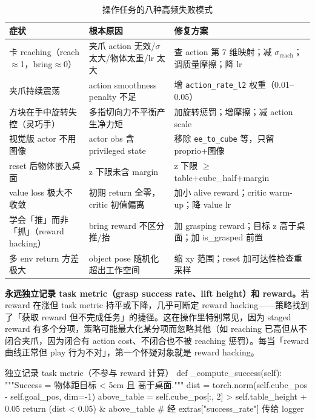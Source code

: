 \begin{table}[ht]
\centering
\small
\caption{操作任务的八种高频失败模式}
\label{tab:rlmc-manip-fail}
\begin{tabular}{@{}p{3.0cm}p{4.2cm}p{4.6cm}@{}}
\toprule
症状 & 根本原因 & 修复方案 \\
\midrule
卡 reaching（reach$\approx$1，bring$\approx$0） & 夹爪 action 无效/$\sigma$ 太大/物体太重/lr 太大 & 查 action 第 7 维映射；减 $\sigma_{\text{reach}}$；调质量摩擦；降 lr \\
夹爪持续震荡 & action smoothness penalty 不足 & 增 \verb|action_rate_l2| 权重（0.01--0.05） \\
方块在手中旋转失控（灵巧手） & 多指切向力不平衡产生净力矩 & 加旋转惩罚；增摩擦；减 action scale \\
视觉版 actor 不用图像 & actor obs 含 privileged state & 移除 \verb|ee_to_cube| 等，只留 proprio+图像 \\
reset 后物体嵌入桌面 & z 下限未含 margin & z 下限 $\ge$ table+cube\_half+margin \\
value loss 极大不收敛 & 初期 return 全零，critic 初值偏离 & 加小 alive reward；critic warm-up；降 value lr \\
学会「推」而非「抓」（reward hacking） & bring reward 不区分推/抬 & 加 grasping reward；目标 z 高于桌面；加 is\_grasped 前置 \\
多 env return 方差极大 & object pose 随机化超出工作空间 & 缩 xy 范围；reset 加可达性检查重采样 \\
\bottomrule
\end{tabular}
\end{table}

\begin{insight}[黄金诊断原则：Reward Up, Task Metric Flat = Reward Hacking]\label{ins:rlmc-manip-hacking}
\textbf{永远独立记录 task metric（grasp success rate、lift height）和 reward。}若 reward 在涨但 task metric 持平或下降，几乎可断定 reward hacking——策略找到了「获取 reward 但不完成任务」的捷径。这在操作里特别常见，因为 staged reward 有多个分项，策略可能最大化某分项而忽略其他（如 reaching 已高但从不闭合夹爪，因为闭合有 action cost、不闭合也不被 reaching 惩罚）。每当「reward 曲线正常但 play 行为不对」，第一个怀疑对象就是 reward hacking。
\end{insight}

\begin{codebox}[Python]{独立记录 task metric（不参与 reward 计算）}
def _compute_success(self):
    """Success = 物体距目标 < 5cm 且 高于桌面."""
    dist = torch.norm(self.cube_pos - self.goal_pos, dim=-1)
    above_table = self.cube_pos[:, 2] > self.table_height + 0.05
    return (dist < 0.05) & above_table   # 经 extras["success_rate"] 传给 logger
\end{codebox}


